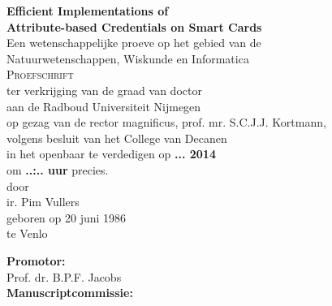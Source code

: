 \thispagestyle{empty}

\begin{center}
  \textbf{\Large Efficient Implementations of\\ Attribute-based Credentials on Smart Cards}\\[15mm]

  Een wetenschappelijke proeve op het gebied van de \\
  Natuurwetenschappen, Wiskunde en Informatica \\[15mm]

  \textsc{Proefschrift} \\[15mm]

  ter verkrijging van de graad van doctor \\
  aan de Radboud Universiteit Nijmegen \\
  op gezag van de rector magnificus, prof. mr. S.C.J.J. Kortmann, \\
  volgens besluit van het College van Decanen \\
  in het openbaar te verdedigen op \textbf{... 2014} \\
  om \textbf{..:.. uur} precies. \\[30mm]

  door \\[30mm]

  ir. Pim Vullers \\[15mm]

  geboren op 20 juni 1986 \\
  te Venlo
\end{center}

\clearpage

\begin{flushleft}
  \thispagestyle{empty}

  \textbf{Promotor:} \\
  \indent Prof. dr. B.P.F. Jacobs \\[15mm]

  \textbf{Manuscriptcommissie:}
\end{flushleft}